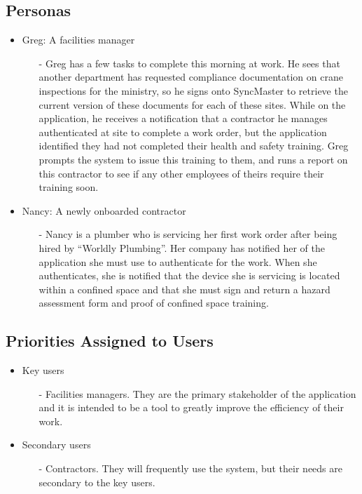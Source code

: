 \documentclass[12pt]{article}
\begin{document}
\subsection{Personas}

\begin{itemize}
    \item Greg: A facilities manager
    \begin{itemize}
        \item[-] Greg has a few tasks to complete this morning at work.
        He sees that another department has requested compliance documentation 
        on crane inspections for the ministry, so he signs onto SyncMaster to 
        retrieve the current version of these documents for each of these sites.
        While on the application, he receives a notification that a contractor 
        he manages authenticated at site to complete a work order, but the 
        application identified they had not completed their health and safety 
        training. Greg prompts the system to issue this training to them, and 
        runs a report on this contractor to see if any other employees of 
        theirs require their training soon.
    \end{itemize}
    \item Nancy: A newly onboarded contractor
    \begin{itemize}
        \item[-] Nancy is a plumber who is servicing her first work order after 
        being hired by ``Worldly Plumbing''.
        Her company has notified her of the application she must use to 
        authenticate for the work. When she authenticates, she is notified that 
        the device she is servicing is located within a confined space
        and that she must sign and return a hazard assessment form and proof 
        of confined space training.
    \end{itemize}
\end{itemize}
\subsection{Priorities Assigned to Users}

\begin{itemize}
    \item Key users
    \begin{itemize}
        \item[-] Facilities managers. They are the primary stakeholder of the 
        application and it is intended to be a tool to greatly improve the 
        efficiency of their work.
    \end{itemize}
    \item Secondary users
    \begin{itemize}
        \item[-] Contractors. They will frequently use the system, but their 
        needs are secondary to the key users.
    \end{itemize}
\end{itemize}
\end{document}

